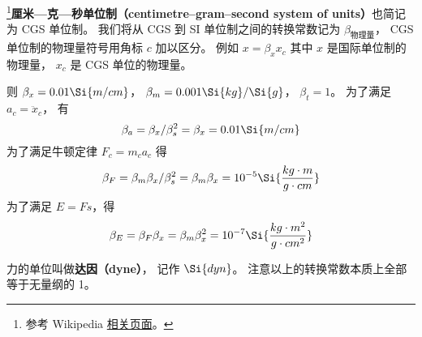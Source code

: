
\begin{issues}
\issueDraft
{}
\end{issues}


\footnote{参考 Wikipedia \href{https://en.wikipedia.org/wiki/Centimetre-gram-second_system_of_units}{相关页面}。}\textbf{厘米—克—秒单位制（centimetre–gram–second system of units）}也简记为 CGS 单位制。 我们将从 CGS 到 SI 单位制之间的转换常数记为 $\beta_\text{物理量}$， CGS 单位制的物理量符号用角标 $c$ 加以区分。 例如 $x = \beta_x x_c$ 其中 $x$ 是国际单位制的物理量， $x_c$ 是 CGS 单位的物理量。

则 $\beta_x = 0.01\Si{m/cm}$， $\beta_m = 0.001\Si{kg}/\Si{g}$， $\beta_t = 1$。 为了满足 $a_c = \ddot x_c$， 有
\begin{equation}
\beta_a = \beta_x/\beta_s^2 = \beta_x = 0.01 \Si{m/cm}
\end{equation}
为了满足牛顿定律 $F_c = m_ca_c$ 得
\begin{equation}
\beta_F = \beta_m \beta_x/\beta_s^2 = \beta_m\beta_x = 10^{-5} \Si{\frac{kg\cdot m}{g\cdot cm}}
\end{equation}
为了满足 $E = Fs$，得
\begin{equation}
\beta_E = \beta_F \beta_x = \beta_m\beta_x^2 =  10^{-7} \Si{\frac{kg \cdot m^2}{g\cdot cm^2}}
\end{equation}

力的单位叫做\textbf{达因（dyne）}， 记作 $\Si{dyn}$。 注意以上的转换常数本质上全部等于无量纲的 1。
